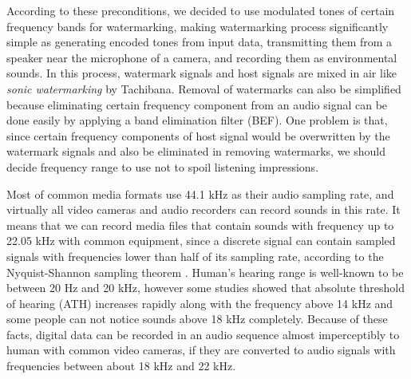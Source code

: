 According to these preconditions, we decided to use modulated tones of certain frequency bands for watermarking, making watermarking process significantly simple as generating encoded tones from input data, transmitting them from a speaker near the microphone of a camera, and recording them as environmental sounds.
In this process, watermark signals and host signals are mixed in air like {\it sonic watermarking} by Tachibana. \cite{tachibana2003audio}
Removal of watermarks can also be simplified because eliminating certain frequency component from an audio signal can be done easily by applying a band elimination filter (BEF).
One problem is that, since certain frequency components of host signal would be overwritten by the watermark signals and also be eliminated in removing watermarks, we should decide frequency range to use not to spoil listening impressions.

Most of common media formats use 44.1 kHz as their audio sampling rate, and virtually all video cameras and audio recorders can record sounds in this rate. It means that we can record media files that contain sounds with frequency up to 22.05 kHz with common equipment, since a discrete signal can contain sampled signals with frequencies lower than half of its sampling rate, according to the Nyquist-Shannon sampling theorem \cite{shannon1949communication}.
Human's hearing range is well-known to be between 20 Hz and 20 kHz, however some studies showed that absolute threshold of hearing (ATH) increases rapidly along with the frequency above 14 kHz and some people can not notice sounds above 18 kHz completely. \cite{:/content/asa/journal/jasa/86/4/10.1121/1.398698, ashihara2006hearing}
Because of these facts, digital data can be recorded in an audio sequence almost imperceptibly to human with common video cameras, if they are converted to audio signals with frequencies between about 18 kHz and 22 kHz.

